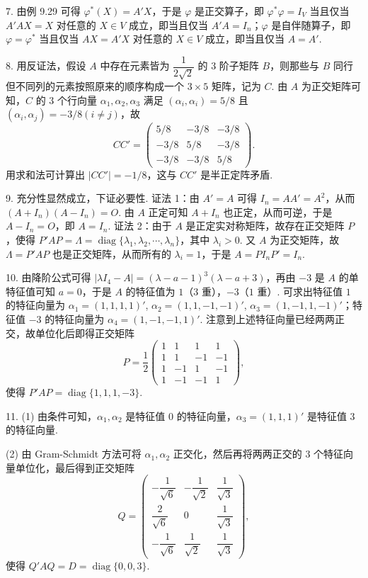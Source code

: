 \documentclass[UTF8,12pt,a4paper,fontset=fandol]{ctexart}
\begin{document}
7. 由例 9.29 可得 $\varphi^*(X)=A'X$，于是 $\varphi$ 是正交算子，即 $\varphi^*\varphi=I_V$ 当且仅当 $A'AX=X$ 对任意的 $X\in V$ 成立，即当且仅当 $A'A=I_n$；$\varphi$ 是自伴随算子，即 $\varphi=\varphi^*$ 当且仅当 $AX=A'X$ 对任意的 $X\in V$ 成立，即当且仅当 $A=A'$.

8. 用反证法，假设 $A$ 中存在元素皆为 $\dfrac{1}{2\sqrt{2}}$ 的 $3$ 阶子矩阵 $B$，则那些与 $B$ 同行但不同列的元素按照原来的顺序构成一个 $3\times5$ 矩阵，记为 $C$. 由 $A$ 为正交矩阵可知，$C$ 的 $3$ 个行向量 $\alpha_1,\alpha_2,\alpha_3$ 满足 $(\alpha_i,\alpha_i)=5/8$ 且 $(\alpha_i,\alpha_j)=-3/8(i\ne j)$，故
\[
CC'=\begin{pmatrix}
5/8&-3/8&-3/8\\
-3/8&5/8&-3/8\\
-3/8&-3/8&5/8
\end{pmatrix}.
\]
用求和法可计算出 $|CC'|=-1/8$，这与 $CC'$ 是半正定阵矛盾.

9. 充分性显然成立，下证必要性. 证法 1：由 $A'=A$ 可得 $I_n=AA'=A^2$，从而 $(A+I_n)(A-I_n)=O$. 由 $A$ 正定可知 $A+I_n$ 也正定，从而可逆，于是 $A-I_n=O$，即 $A=I_n$. 证法 2：由于 $A$ 是正定实对称矩阵，故存在正交矩阵 $P$，使得 $P'AP=\Lambda=\operatorname{diag}\{\lambda_1,\lambda_2,\cdots,\lambda_n\}$，其中 $\lambda_i>0$. 又 $A$ 为正交矩阵，故 $\Lambda=P'AP$ 也是正交矩阵，从而所有的 $\lambda_i=1$，于是 $A=PI_nP'=I_n$.

10. 由降阶公式可得 $|\lambda I_4-A|=(\lambda-a-1)^3(\lambda-a+3)$，再由 $-3$ 是 $A$ 的单特征值可知 $a=0$，于是 $A$ 的特征值为 $1$（$3$ 重），$-3$（$1$ 重）. 可求出特征值 $1$ 的特征向量为 $\alpha_1=(1,1,1,1)'$, $\alpha_2=(1,1,-1,-1)'$, $\alpha_3=(1,-1,1,-1)'$；特征值 $-3$ 的特征向量为 $\alpha_4=(1,-1,-1,1)'$. 注意到上述特征向量已经两两正交，故单位化后即得正交矩阵
\[
P=\frac{1}{2}\begin{pmatrix}
1&1&1&1\\
1&1&-1&-1\\
1&-1&1&-1\\
1&-1&-1&1
\end{pmatrix},
\]
使得 $P'AP=\operatorname{diag}\{1,1,1,-3\}$.

11. (1) 由条件可知，$\alpha_1,\alpha_2$ 是特征值 $0$ 的特征向量，$\alpha_3=(1,1,1)'$ 是特征值 $3$ 的特征向量.

(2) 由 Gram-Schmidt 方法可将 $\alpha_1,\alpha_2$ 正交化，然后再将两两正交的 $3$ 个特征向量单位化，最后得到正交矩阵
\[
Q=\begin{pmatrix}
-\dfrac{1}{\sqrt{6}}&-\dfrac{1}{\sqrt{2}}&\dfrac{1}{\sqrt{3}}\\
\dfrac{2}{\sqrt{6}}&0&\dfrac{1}{\sqrt{3}}\\
-\dfrac{1}{\sqrt{6}}&\dfrac{1}{\sqrt{2}}&\dfrac{1}{\sqrt{3}}
\end{pmatrix},
\]
使得 $Q'AQ=D=\operatorname{diag}\{0,0,3\}$.
\end{document}
